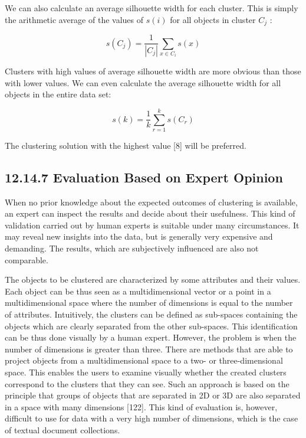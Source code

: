 \documentclass[10pt]{book}
\begin{document}
We can also calculate an average silhouette width for each cluster. This is simply the arithmetic average of the values of $s(i)$ for all objects in cluster $C_{j}$ :


\begin{equation*}
s\left(C_{j}\right)=\frac{1}{\left|C_{j}\right|} \sum_{x \in C_{i}} s(x) \tag{12.57}
\end{equation*}


Clusters with high values of average silhouette width are more obvious than those with lower values. We can even calculate the average silhouette width for all objects in the entire data set:


\begin{equation*}
s(k)=\frac{1}{k} \sum_{r=1}^{k} s\left(C_{r}\right) \tag{12.58}
\end{equation*}


The clustering solution with the highest value [8] will be preferred.

\subsection*{12.14.7 Evaluation Based on Expert Opinion}
When no prior knowledge about the expected outcomes of clustering is available, an expert can inspect the results and decide about their usefulness. This kind of validation carried out by human experts is suitable under many circumstances. It may reveal new insights into the data, but is generally very expensive and demanding. The results, which are subjectively influenced are also not comparable.

The objects to be clustered are characterized by some attributes and their values. Each object can be thus seen as a multidimensional vector or a point in a multidimensional space where the number of dimensions is equal to the number of attributes. Intuitively, the clusters can be defined as sub-spaces containing the objects which are clearly separated from the other sub-spaces. This identification can be thus done visually by a human expert. However, the problem is when the number of dimensions is greater than three. There are methods that are able to project objects from a multidimensional space to a two- or three-dimensional space. This enables the users to examine visually whether the created clusters correspond to the clusters that they can see. Such an approach is based on the principle that groups of objects that are separated in 2D or 3D are also separated in a space with many dimensions [122]. This kind of evaluation is, however, difficult to use for data with a very high number of dimensions, which is the case of textual document collections.
\end{document}
